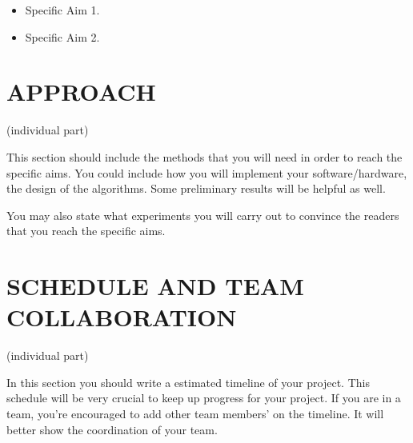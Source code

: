 \documentclass[letterpaper, 10 pt, conference]{ieeeconf}  %
\begin{document}
\begin{itemize}
\item Specific Aim 1.
\item Specific Aim 2.
\end{itemize}

\section{APPROACH}

(individual part)

This section should include the methods that you will need in order to reach the specific aims. You could include how you will implement your software/hardware, the design of the algorithms. Some preliminary results will be helpful as well. 

You may also state what experiments you will carry out to convince the readers that you reach the specific aims.

\section{SCHEDULE AND TEAM COLLABORATION}

(individual part)

In this section you should write a estimated timeline of your project. This schedule will be very crucial to keep up progress for your project. If you are in a team, you're encouraged to add other team members' on the timeline. It will better show the coordination of your team.
   

\addtolength{\textheight}{-12cm}   %



\end{document}
